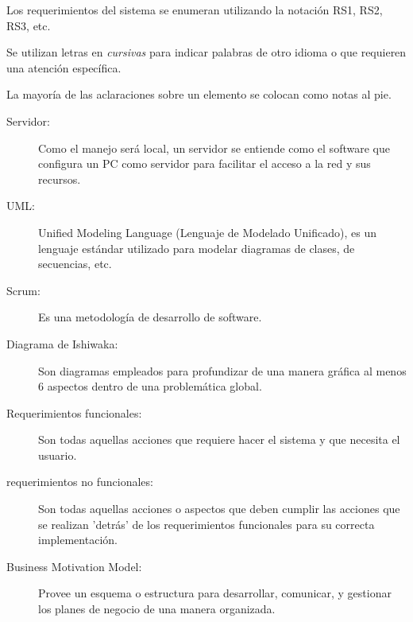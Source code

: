 Los requerimientos del sistema se enumeran utilizando la notación RS1, RS2, RS3, etc.
	
Se utilizan letras en {\em cursivas} para indicar palabras de otro idioma o que requieren una atención específica. 
	
La mayoría de las aclaraciones sobre un elemento se colocan como notas al pie.
	
\begin{description}
	\item[Servidor:] Como el manejo será local, un servidor se entiende como el software que configura un PC como servidor para facilitar el acceso a la red y sus recursos.
\end{description}

\begin{description}
	\item[UML:] Unified Modeling Language (Lenguaje de Modelado Unificado), es un lenguaje estándar utilizado para modelar diagramas de clases, de secuencias, etc.
\end{description}

\begin{description}
	\item[Scrum:] Es una metodología de desarrollo de software.
\end{description}

\begin{description}
	\item[Diagrama de Ishiwaka:] Son diagramas empleados para profundizar de una manera gráfica al menos 6 aspectos dentro de una problemática global.
\end{description}

\begin{description}
	\item[Requerimientos funcionales:] Son todas aquellas acciones que requiere hacer el sistema y que necesita el usuario.
\end{description}

\begin{description}
	\item[requerimientos no funcionales:] Son todas aquellas acciones o aspectos que deben cumplir las acciones que se realizan 'detrás' de los requerimientos funcionales para su correcta implementación.
\end{description}

\begin{description}
	\item[Business Motivation Model:] Provee un esquema o estructura para desarrollar, comunicar, y gestionar los planes de negocio de una manera organizada.
\end{description}

